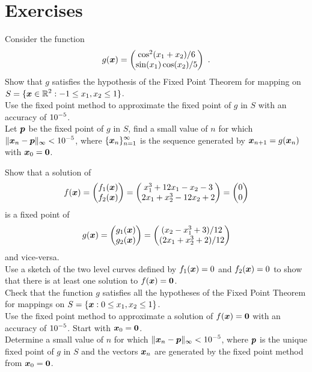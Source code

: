 \section{Exercises}

\begin{question}
Consider the function
\[
g(\bm{x}) = \begin{pmatrix}
\cos^2(x_1+x_2)/6 \\
\sin(x_1)\cos(x_2)/5
\end{pmatrix} \ .
\]
 Show that $g$ satisfies the hypothesis of the Fixed Point
Theorem for mapping on
$\displaystyle S = \{ \bm{x} \in \mathbb{R}^2 : -1\leq x_1,x_2 \leq 1 \}$.\\
 Use the fixed point method to approximate
the fixed point of $g$ in $S$ with an accuracy of $\displaystyle 10^{-5}$.\\
 Let $\bm{p}$ be the fixed point of $g$ in $S$, find a small value
of $n$ for which $\displaystyle \| \bm{x}_n - \bm{p}\|_\infty < 10^{-5}$, where
$\displaystyle \{\bm{x}_n\}_{n=1}^\infty$ is the sequence generated by
$\bm{x}_{n+1} = g(\bm{x}_n)$ with $\bm{x}_0 = \bm{0}$. 
\end{question}

\begin{question}
 Show that a solution of
\[
f(\bm{x}) = \begin{pmatrix} f_1(\bm{x}) \\ f_2(\bm{x}) \end{pmatrix}
= \begin{pmatrix}
x_1^3 + 12x_1 - x_2 - 3 \\
2x_1 + x_2^3 - 12x_2 + 2
\end{pmatrix}
= \begin{pmatrix} 0 \\ 0 \end{pmatrix}
\]
is a fixed point of
\[
g(\bm{x}) = \begin{pmatrix} g_1(\bm{x}) \\ g_2(\bm{x}) \end{pmatrix}
= \begin{pmatrix}
(x_2 - x_1^3 + 3)/12 \\
(2x_1 + x_2^3 +2)/12
\end{pmatrix}
\]
and vice-versa.\\
 Use a sketch of the two level curves defined by $f_1(\bm{x})=0$
and $f_2(\bm{x}) =0$ to show that there is at least one solution to
$f(\bm{x}) = \bm{0}$.\\
 Check that the function $g$ satisfies all the hypotheses of
the Fixed Point Theorem for mappings on
$S =\left\{ \bm{x} : 0 \leq x_1, x_2 \leq 1 \right\}$.\\
 Use the fixed point method to approximate a
solution of $f(\bm{x}) = \bm{0}$ with an accuracy of $\displaystyle 10^{-5}$.
Start with $\bm{x}_0 = \bm{0}$.\\
 Determine a small value of $n$ for which
$\displaystyle \| \bm{x}_n - \bm{p}\|_\infty < 10^{-5}$, where $\bm{p}$ is the
unique fixed point of $g$ in $S$ and the vectors $\bm{x}_n$ are
generated by the fixed point method from $\bm{x}_0 = \bm{0}$.
\end{question}

